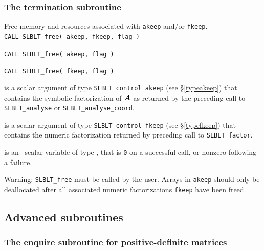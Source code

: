 \documentclass{galahad}
\newcommand{\packagename}{SLBLT}
\begin{document}

\subsubsection{The termination subroutine}

Free memory and resources associated with {\tt akeep} and/or
{\tt fkeep}.\\

\hskip0.5in
{\tt CALL \packagename\_free( akeep, fkeep, flag )}

\hskip0.5in
{\tt CALL \packagename\_free( akeep, flag )}

\hskip0.5in
{\tt CALL \packagename\_free( fkeep, flag )}

\begin{description}

 is a scalar \intentinout argument of type
{\tt \packagename\_control\_akeep} (see \S\ref{typeakeep}) that contains the 
symbolic factorization of ${\bm{A}}$ as returned by the preceding call
to {\tt \packagename\_analyse} or {\tt \packagename\_analyse\_coord}.

 is a scalar \intentinout argument of type
{\tt \packagename\_control\_fkeep} (see \S\ref{typefkeep}) that contains the 
numeric factorization returned by preceding call to {\tt \packagename\_factor}.

 is an \intentout\ scalar variable of type \integer,
that is {\tt 0} on a successful call, or nonzero following a failure.

\end{description}

Warning:
{\tt \packagename\_free} must be called by the user. 
Arrays in {\tt akeep} should only be deallocated
after all associated numeric factorizations {\tt fkeep} have been
freed.

\subsection{Advanced subroutines} \label{advanced-subroutines}


\subsubsection{The enquire subroutine for positive-definite matrices}
\end{document}
